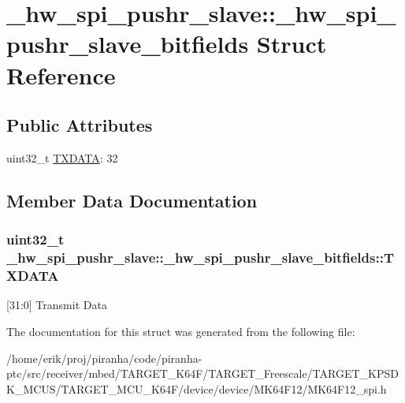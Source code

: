 \hypertarget{struct__hw__spi__pushr__slave_1_1__hw__spi__pushr__slave__bitfields}{}\section{\+\_\+hw\+\_\+spi\+\_\+pushr\+\_\+slave\+:\+:\+\_\+hw\+\_\+spi\+\_\+pushr\+\_\+slave\+\_\+bitfields Struct Reference}
\label{struct__hw__spi__pushr__slave_1_1__hw__spi__pushr__slave__bitfields}
\subsection*{Public Attributes}
\begin{DoxyCompactItemize}
\item 
uint32\+\_\+t \hyperlink{struct__hw__spi__pushr__slave_1_1__hw__spi__pushr__slave__bitfields_af04b83c5b17ffb793b06ea0cf2e2e142}{T\+X\+D\+A\+TA}\+: 32
\end{DoxyCompactItemize}


\subsection{Member Data Documentation}
\subsubsection[{\texorpdfstring{T\+X\+D\+A\+TA}{TXDATA}}]{\setlength{\rightskip}{0pt plus 5cm}uint32\+\_\+t \+\_\+hw\+\_\+spi\+\_\+pushr\+\_\+slave\+::\+\_\+hw\+\_\+spi\+\_\+pushr\+\_\+slave\+\_\+bitfields\+::\+T\+X\+D\+A\+TA}\hypertarget{struct__hw__spi__pushr__slave_1_1__hw__spi__pushr__slave__bitfields_af04b83c5b17ffb793b06ea0cf2e2e142}{}\label{struct__hw__spi__pushr__slave_1_1__hw__spi__pushr__slave__bitfields_af04b83c5b17ffb793b06ea0cf2e2e142}
\mbox{[}31\+:0\mbox{]} Transmit Data 

The documentation for this struct was generated from the following file\+:\begin{DoxyCompactItemize}
\item 
/home/erik/proj/piranha/code/piranha-\/ptc/src/receiver/mbed/\+T\+A\+R\+G\+E\+T\+\_\+\+K64\+F/\+T\+A\+R\+G\+E\+T\+\_\+\+Freescale/\+T\+A\+R\+G\+E\+T\+\_\+\+K\+P\+S\+D\+K\+\_\+\+M\+C\+U\+S/\+T\+A\+R\+G\+E\+T\+\_\+\+M\+C\+U\+\_\+\+K64\+F/device/device/\+M\+K64\+F12/M\+K64\+F12\+\_\+spi.\+h\end{DoxyCompactItemize}
